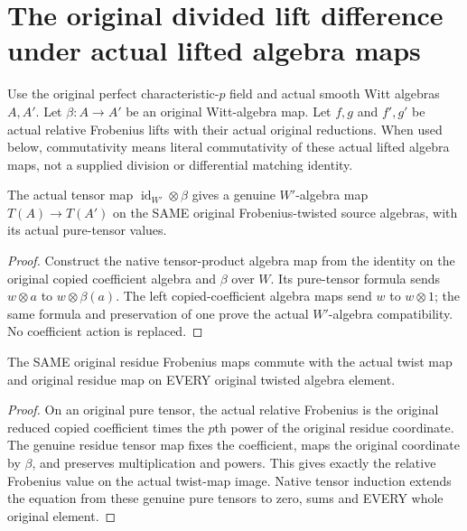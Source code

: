 \section{The original divided lift difference under actual lifted algebra maps}
\label{sec:witt-two-lift-difference-naturality}

Use the original perfect characteristic-$p$ field and actual smooth
Witt algebras $A,A'$. Let $\beta:A\to A'$ be an original Witt-algebra
map. Let $f,g$ and $f',g'$ be actual relative Frobenius lifts with
their actual original reductions. When used below, commutativity
means literal commutativity of these actual lifted algebra maps,
not a supplied division or differential matching identity.

\begin{definition}
\label{def:witt-two-actual-twist-restriction-map}
\leanok
{}
The actual tensor map $\operatorname{id}_{W'}\otimes\beta$ gives
a genuine $W'$-algebra map $T(A)\to T(A')$ on the SAME original
Frobenius-twisted source algebras, with its actual pure-tensor values.
\end{definition}
\begin{proof}
Construct the native tensor-product algebra map from the identity
on the original copied coefficient algebra and $\beta$ over $W$.
Its pure-tensor formula sends $w\otimes a$ to $w\otimes\beta(a)$.
The left copied-coefficient algebra maps send $w$ to $w\otimes1$;
the same formula and preservation of one prove the actual
$W'$-algebra compatibility. No coefficient action is replaced.
\end{proof}

\begin{theorem}
\label{thm:witt-two-actual-residue-frobenius-naturality}
\leanok
{}
The SAME original residue Frobenius maps commute with the actual
twist map and original residue map on EVERY original twisted
algebra element.
\end{theorem}
\begin{proof}
On an original pure tensor, the actual relative Frobenius is the
original reduced copied coefficient times the $p$th power of the
original residue coordinate. The genuine residue tensor map fixes
the coefficient, maps the original coordinate by $\beta$, and
preserves multiplication and powers. This gives exactly the
relative Frobenius value on the actual twist-map image. Native
tensor induction extends the equation from these genuine pure
tensors to zero, sums and EVERY whole original element.
\end{proof}

